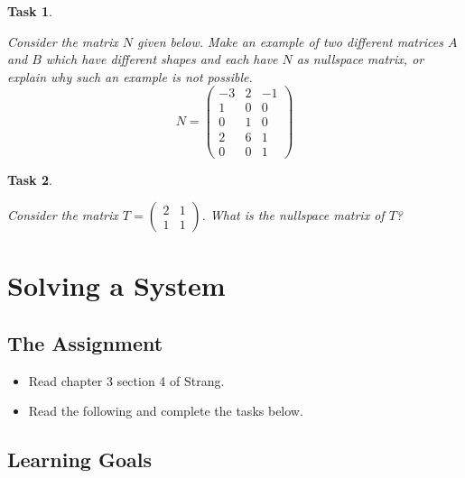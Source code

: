 \documentclass[10pt,]{book}
\theoremstyle{plain}
\numberwithin{equation}{section}
\newtheorem{task}{Task}[chapter]
\begin{document}
\begin{task}
\label{task-98}

        Consider the matrix \(N\) given below. Make an example of two
        different matrices \(A\) and \(B\) which have different shapes
        and each have \(N\) as nullspace matrix, or explain why such an
        example is not possible.
        \[
        N = \begin{pmatrix}
        -3 & 2 & -1 \\
         1 & 0 &  0 \\
         0 & 1 &  0 \\
         2 & 6 &  1 \\
         0 & 0 &  1
        \end{pmatrix}
        \]\end{task}
\begin{task}
\label{task-99}

        Consider the matrix \(T = \left(\begin{smallmatrix} 2 &
        1 \\ 1 & 1 \end{smallmatrix}\right)\). What is the nullspace
        matrix of \(T\)?
      \end{task}
\clearpage
\typeout{************************************************}
\typeout{************************************************}
\section[Solving a System]{Solving a System}\label{complete-solution}
\typeout{************************************************}
\typeout{************************************************}
\subsection[The Assignment]{The Assignment}\label{subsection-73}
\begin{itemize}
\item{}Read chapter 3 section 4 of Strang.\item{}Read the following and complete the tasks below.\end{itemize}
\typeout{************************************************}
\typeout{************************************************}
\subsection[Learning Goals]{Learning Goals}\label{subsection-74}
\end{document}

